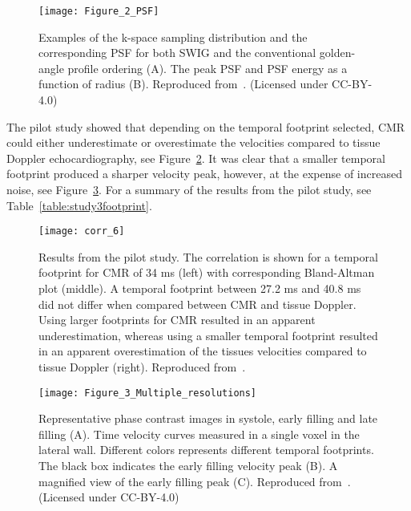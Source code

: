 \begin{figure}[htbp]
    \centering
    \texttt{[image: Figure\_2\_PSF]}
    \caption{Examples of the k-space sampling distribution and the corresponding PSF for both SWIG and the conventional golden-angle profile ordering (A). The peak PSF and PSF energy as a function of radius (B). Reproduced from~\cite{Fyrdahl2020}. (Licensed under CC-BY-4.0)}
    \label{fig:study3_1}
\end{figure}

The pilot study showed that depending on the temporal footprint selected, CMR could either underestimate or overestimate the velocities compared to tissue Doppler echocardiography, see Figure~\ref{fig:study3_abstract}. It was clear that a smaller temporal footprint produced a sharper velocity peak, however, at the expense of increased noise, see Figure~\ref{fig:study3_2}. For a summary of the results from the pilot study, see Table~\ref{table:study3footprint}.

\begin{figure}[htbp]
    \centering
    \texttt{[image: corr\_6]}
    \caption{Results from the pilot study. The correlation is shown for a temporal footprint for CMR of 34 ms (left) with corresponding Bland-Altman plot (middle). A temporal footprint between 27.2 ms and 40.8 ms did not differ when compared between CMR and tissue Doppler. Using larger footprints for CMR resulted in an apparent underestimation, whereas using a smaller temporal footprint resulted in an apparent overestimation of the tissues velocities compared to tissue Doppler (right). Reproduced from~\cite{Fyrdahl2018:SCMR}.}
    \label{fig:study3_abstract}
\end{figure}


\begin{figure}[htbp]
    \centering
    \texttt{[image: Figure\_3\_Multiple\_resolutions]}
    \caption{Representative phase contrast images in systole, early filling and late filling (A). Time velocity curves measured in a single voxel in the lateral wall. Different colors represents different temporal footprints. The black box indicates the early filling velocity peak (B). A magnified view of the early filling peak (C). Reproduced from~\cite{Fyrdahl2020}. (Licensed under CC-BY-4.0)}
    \label{fig:study3_2}
\end{figure}

